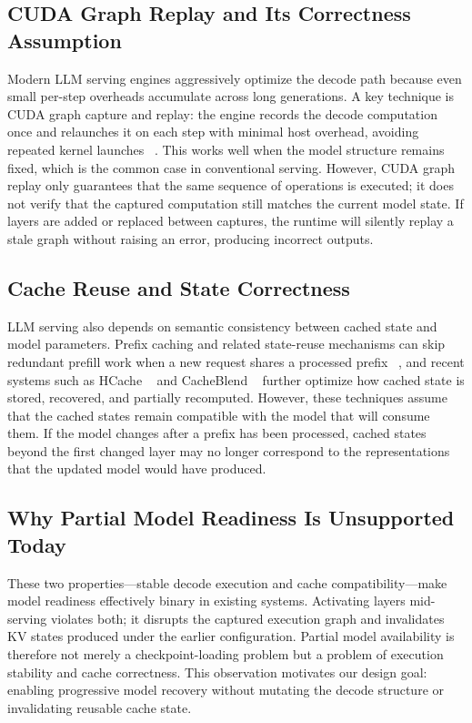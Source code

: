 \documentclass[sigplan,anonymous,review,nonacm]{acmart}
\begin{document}
\subsection{CUDA Graph Replay and Its Correctness Assumption}
Modern LLM serving engines aggressively optimize the decode path because even small per-step overheads accumulate across long generations. A key technique is CUDA graph capture and replay: the engine records the decode computation once and relaunches it on each step with minimal host overhead, avoiding repeated kernel launches ~\cite{vllm_sosp23,vllm_cudagraph_docs,vllm_opt_levels,nvidia_cuda_graphs}. This works well when the model structure remains fixed, which is the common case in conventional serving. However, CUDA graph replay only guarantees that the same sequence of operations is executed; it does not verify that the captured computation still matches the current model state. If layers are added or replaced between captures, the runtime will silently replay a stale graph without raising an error, producing incorrect outputs. 

\subsection{Cache Reuse and State Correctness}
LLM serving also depends on semantic consistency between cached state and model parameters. Prefix caching and related state-reuse mechanisms can skip redundant prefill work when a new request shares a processed prefix ~\cite{vllm_prefix_docs}, and recent systems such as HCache ~\cite{hcache_eurosys25} and CacheBlend ~\cite{cacheblend_eurosys25} further optimize how cached state is stored, recovered, and partially recomputed. However, these techniques assume that the cached states remain compatible with the model that will consume them. If the model changes after a prefix has been processed, cached states beyond the first changed layer may no longer correspond to the representations that the updated model would have produced.

\subsection{Why Partial Model Readiness Is Unsupported Today}
These two properties---stable decode execution and cache compatibility---make model readiness effectively binary in existing systems. Activating layers mid-serving violates both; it disrupts the captured execution graph and invalidates KV states produced under the earlier configuration. Partial model availability is therefore not merely a checkpoint-loading problem but a problem of execution stability and cache correctness. This observation motivates our design goal: enabling progressive model recovery without mutating the decode structure or invalidating reusable cache state.
\end{document}
